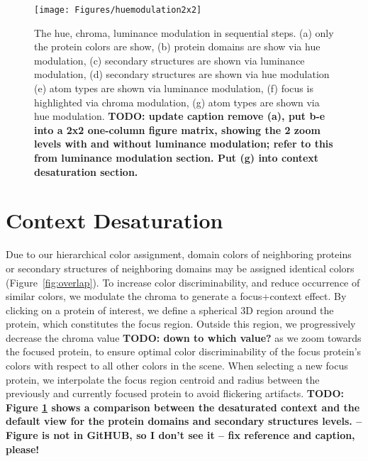 \documentclass{egpubl}
\begin{document}
		\begin{figure}[t]
			\centering
			\texttt{[image: Figures/huemodulation2x2]}
			\caption{The hue, chroma, luminance modulation in sequential steps.
				(a) only the protein colors are show, (b) protein domains are show via hue modulation, (c) secondary structures are shown via luminance modulation, (d) secondary structures are shown via hue modulation
				(e) atom types are shown via luminance modulation, (f) focus is highlighted via chroma modulation, (g) atom types are shown via hue modulation. \textbf{TODO: update caption remove (a), put b-e into a 2x2 one-column figure matrix, showing the 2 zoom levels with and without luminance modulation; refer to this from luminance modulation section. Put (g) into context desaturation section. }}
			\label{fig:results_2}
		\end{figure}
	
	
	

	
	
	\section{Context Desaturation}
	\label{sec:chroma}
	
	
	Due to our hierarchical color assignment, domain colors of neighboring proteins or secondary structures of neighboring domains may be assigned identical colors (Figure~\ref{fig:overlap}).
	To increase color discriminability, and reduce occurrence of similar colors, we modulate the chroma to generate a focus+context effect. 
	By clicking on a protein of interest, we define a spherical 3D region around the protein, which constitutes the focus region. 
	Outside this region, we progressively decrease the chroma value \textbf{TODO: down to which value?} as we zoom towards the focused protein, to ensure optimal color discriminability of the focus protein's colors with respect to all other colors in the scene. 
	When selecting a new focus protein, we interpolate the focus region centroid and radius between the previously and currently focused protein to avoid flickering artifacts.
	\textbf{TODO: Figure \ref{fig:results_2} shows a comparison between the desaturated context and the default view for the protein domains and secondary structures levels. -- Figure is not in GitHUB, so I don't see it -- fix reference and caption, please!}
	
\end{document}
